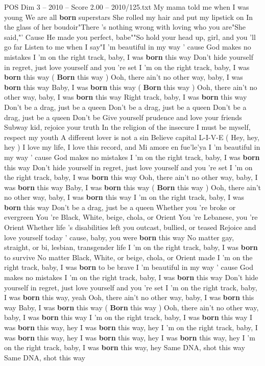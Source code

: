 \begin{textsample}{POS Dim 3 – 2010 – Score 2.00 – 2010/125.txt}
My mama told me when I was young We are all \textbf{born} superstars She rolled my hair and put my lipstick on In the glass of her boudoir"There 's nothing wrong with loving who you are"She said,"' Cause He made you perfect, babe""So hold your head up, girl, and you 'll go far Listen to me when I say"I 'm beautiful in my way ' cause God makes no mistakes I 'm on the right track, baby, I was \textbf{born} this way Don't hide yourself in regret, just love yourself and you 're set I 'm on the right track, baby, I was \textbf{born} this way ( \textbf{Born} this way ) Ooh, there ain't no other way, baby, I was \textbf{born} this way Baby, I was \textbf{born} this way ( \textbf{Born} this way ) Ooh, there ain't no other way, baby, I was \textbf{born} this way Right track, baby, I was \textbf{born} this way Don't be a drag, just be a queen Don't be a drag, just be a queen Don't be a drag, just be a queen Don't be Give yourself prudence and love your friends Subway kid, rejoice your truth In the religion of the insecure I must be myself, respect my youth A different lover is not a sin Believe capital L-I-V-E ( Hey, hey, hey ) I love my life, I love this record, and Mi amore en fue'le'ya I 'm beautiful in my way ' cause God makes no mistakes I 'm on the right track, baby, I was \textbf{born} this way Don't hide yourself in regret, just love yourself and you 're set I 'm on the right track, baby, I was \textbf{born} this way Ooh, there ain't no other way, baby, I was \textbf{born} this way Baby, I was \textbf{born} this way ( \textbf{Born} this way ) Ooh, there ain't no other way, baby, I was \textbf{born} this way I 'm on the right track, baby, I was \textbf{born} this way Don't be a drag, just be a queen Whether you 're broke or evergreen You 're Black, White, beige, chola, or Orient You 're Lebanese, you 're Orient Whether life 's disabilities left you outcast, bullied, or teased Rejoice and love yourself today ' cause, baby, you were \textbf{born} this way No matter gay, straight, or bi, lesbian, transgender life I 'm on the right track, baby, I was \textbf{born} to survive No matter Black, White, or beige, chola, or Orient made I 'm on the right track, baby, I was \textbf{born} to be brave I 'm beautiful in my way ' cause God makes no mistakes I 'm on the right track, baby, I was \textbf{born} this way Don't hide yourself in regret, just love yourself and you 're set I 'm on the right track, baby, I was \textbf{born} this way, yeah Ooh, there ain't no other way, baby, I was \textbf{born} this way Baby, I was \textbf{born} this way ( \textbf{Born} this way ) Ooh, there ain't no other way, baby, I was \textbf{born} this way I 'm on the right track, baby, I was \textbf{born} this way I was \textbf{born} this way, hey I was \textbf{born} this way, hey I 'm on the right track, baby, I was \textbf{born} this way, hey I was \textbf{born} this way, hey I was \textbf{born} this way, hey I 'm on the right track, baby, I was \textbf{born} this way, hey Same DNA, shot this way Same DNA, shot this way

\end{textsample}
